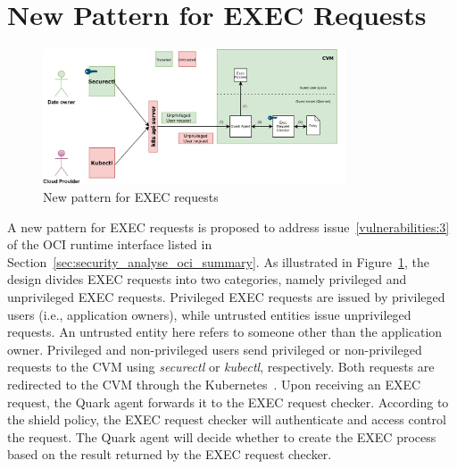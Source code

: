 \section{New Pattern for EXEC Requests}
\label{sec:design_EXEC_Requests}
\begin{figure}[!htb]
    \centering
    \includegraphics[width=0.8\textwidth]{images/new_pattern_of_exec.png}
    \caption[New pattern for EXEC requests]{New pattern for EXEC requests}
    \label{fig:new_pattern_of_exec}
\end{figure}


A new pattern for EXEC requests is proposed to address issue~\ref{vulnerabilities:3} of the OCI runtime interface listed in Section~\ref{sec:security_analyse_oci_summary}. As illustrated in Figure~\ref{fig:new_pattern_of_exec}, the design divides EXEC requests into two categories, namely privileged and unprivileged EXEC requests. 
Privileged EXEC requests are issued by privileged users (i.e., application owners), while untrusted entities issue unprivileged requests. An untrusted entity here refers to someone other than the application owner. Privileged and non-privileged users send privileged or non-privileged requests to the \acrshort{CVM} using \emph{securectl} or \emph{kubectl}, 
respectively. Both requests are redirected to the \acrshort{CVM} through the Kubernetes~\cite*{k8s}. Upon receiving an EXEC request, the Quark agent forwards it to the EXEC request checker. According to the shield policy, the EXEC request checker will authenticate and access control the request. The Quark agent will decide whether to create the 
EXEC process based on the result returned by the EXEC request checker.


